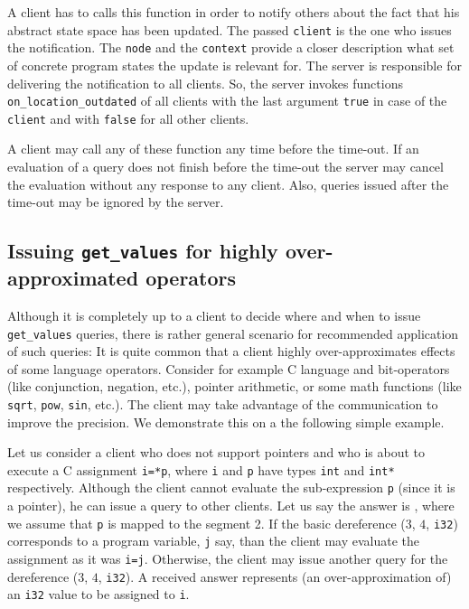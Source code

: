 \documentclass[envcountsame]{llncs}
\newcommand{\tmbraw}[3]{(\ensuremath{#1}, \ensuremath{#2}, \texttt{#3})}
\newcommand{\tmb}[3]{\tmbraw{#1}{#2}{#3}}
\begin{document}
A client has to calls this function in order to notify others about the fact
that his abstract state space has been updated. The passed \texttt{client} is
the one who issues the notification. The \texttt{node} and the \texttt{context}
provide a closer description what set of concrete program states the update is
relevant for. The server is responsible for delivering the notification to all
clients. So, the server invokes functions \texttt{on\_location\_outdated} of all
clients with the last argument \texttt{true} in case of the \texttt{client} and
with \texttt{false} for all other clients. \newline

A client may call any of these function any time before the time-out. If an
evaluation of a query does not finish before the time-out the server may cancel
the evaluation without any response to any client. Also, queries issued after
the time-out may be ignored by the server.


\subsection{Issuing {\tt get\_values} for highly over-approximated operators}
\label{sec:IssueingGetValues}

Although it is completely up to a client to decide where and when to issue
\texttt{get\_values} queries, there is rather general scenario for recommended
application of such queries: It is quite common that a client highly
over-approximates effects of some language operators. Consider for example C
language and bit-operators (like conjunction, negation, etc.), pointer
arithmetic, or some math functions (like \texttt{sqrt}, \texttt{pow},
\texttt{sin}, etc.). The client may take advantage of the communication to
improve the precision. We demonstrate this on a the following simple example.

Let us consider a client who does not support pointers and who is about to
execute a C assignment \texttt{i=*p}, where \texttt{i} and \texttt{p} have types
\texttt{int} and \texttt{int*} respectively. Although the client cannot evaluate
the  sub-expression \texttt{p} (since it is a pointer), he can issue a query to
other clients. Let us say the answer is , where we assume that \texttt{p} is mapped to the
segment 2. If the basic dereference \tmb{3}{4}{i32} corresponds to a program
variable, \texttt{j} say, than the client may evaluate the assignment as it was
\texttt{i=j}. Otherwise, the client may issue another query for the dereference
\tmb{3}{4}{i32}. A received answer represents (an over-approximation of) an
\texttt{i32} value to be assigned to \texttt{i}.
\end{document}
